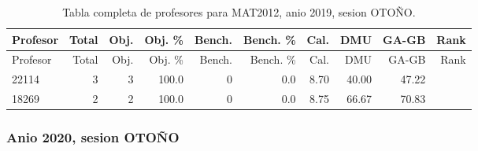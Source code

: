 \begingroup
\scriptsize
\setlength{\tabcolsep}{3pt}
\begin{longtable}{lrrrrrrrrr}
\caption{Tabla completa de profesores para MAT2012, anio 2019, sesion OTOÑO.}\label{tab:prof-period-mat2012-2019-oto-o}\\
\toprule
Profesor & Total & Obj. & Obj. \% & Bench. & Bench. \% & Cal. & DMU & GA-GB & Rank \\
\midrule
\endfirsthead
\toprule
Profesor & Total & Obj. & Obj. \% & Bench. & Bench. \% & Cal. & DMU & GA-GB & Rank \\
\midrule
\endhead
22114 & 3 & 3 & 100.0 & 0 & 0.0 & 8.70 & 40.00 & 47.22 &  \\
18269 & 2 & 2 & 100.0 & 0 & 0.0 & 8.75 & 66.67 & 70.83 &  \\
\bottomrule
\end{longtable}
\endgroup

\subsubsection{Anio 2020, sesion OTOÑO}

